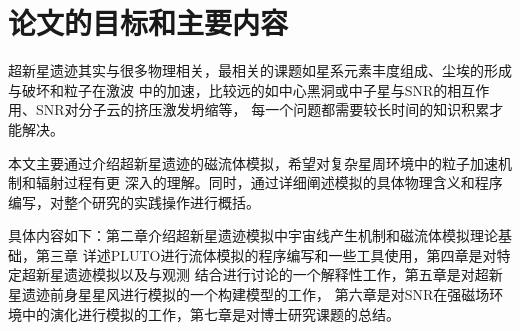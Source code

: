\section{论文的目标和主要内容}
\label{Aim}
超新星遗迹其实与很多物理相关，最相关的课题如星系元素丰度组成、尘埃的形成与破坏和粒子在激波
中的加速，比较远的如中心黑洞或中子星与SNR的相互作用、SNR对分子云的挤压激发坍缩等，
每一个问题都需要较长时间的知识积累才能解决。

本文主要通过介绍超新星遗迹的磁流体模拟，希望对复杂星周环境中的粒子加速机制和辐射过程有更
深入的理解。同时，通过详细阐述模拟的具体物理含义和程序编写，对整个研究的实践操作进行概括。

具体内容如下：第二章介绍超新星遗迹模拟中宇宙线产生机制和磁流体模拟理论基础，第三章
详述PLUTO进行流体模拟的程序编写和一些工具使用，第四章是对特定超新星遗迹模拟以及与观测
结合进行讨论的一个解释性工作，第五章是对超新星遗迹前身星星风进行模拟的一个构建模型的工作，
第六章是对SNR在强磁场环境中的演化进行模拟的工作，第七章是对博士研究课题的总结。
